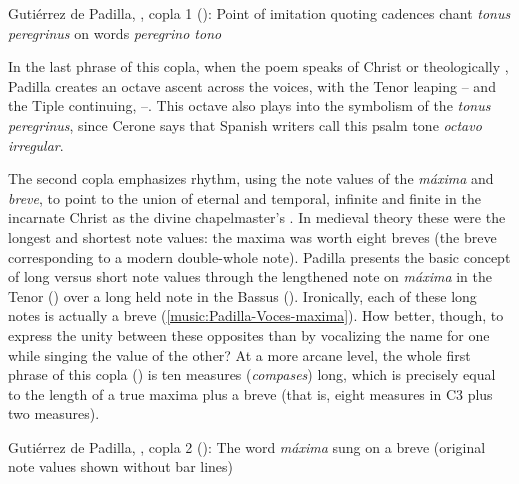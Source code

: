 \begin{musicexample}
    \caption{Gutiérrez de Padilla, , copla 1
    (): Point of imitation quoting cadences chant \emph{tonus
    peregrinus} on words \emph{peregrino tono}}

    \label{music:Padilla-Voces-peregrino_tono}

\end{musicexample}

In the last phrase of this copla, when the poem speaks of Christ  or theologically , Padilla
creates an octave ascent across the voices, with the Tenor leaping
-- and the Tiple continuing, --.
This octave also plays into the symbolism of the \emph{tonus peregrinus}, since
Cerone says that Spanish writers call this  psalm tone
\emph{octavo irregular}.%
    \Autocite[354]{Cerone:Melopeo}

The second copla emphasizes rhythm, using the note values of the \emph{máxima}
and \emph{breve}, to point to the union of eternal and temporal, infinite and
finite in the incarnate Christ as the divine chapelmaster's
.
In medieval theory these were the longest and shortest note values: the maxima
was worth eight breves (the breve corresponding to a modern double-whole note).
Padilla presents the basic concept of long versus short note values through the
lengthened note on \emph{máxima} in the Tenor () over a long
held note in the Bassus ().
Ironically, each of these long notes is actually a breve
(\cref{music:Padilla-Voces-maxima}).  
How better, though, to express the unity between these opposites than by
vocalizing the name for one while singing the value of the other?
At a more arcane level, the whole first phrase of this copla
() is ten measures (\emph{compases}) long, which is precisely
equal to the length of a true maxima plus a breve (that is, eight measures in C3
plus two measures).

\begin{musicexample}
    \caption{Gutiérrez de Padilla, , copla 2
    (): The word \emph{máxima} sung on a breve (original note
    values shown without bar lines)}
    
    \label{music:Padilla-Voces-maxima}

\end{musicexample}


